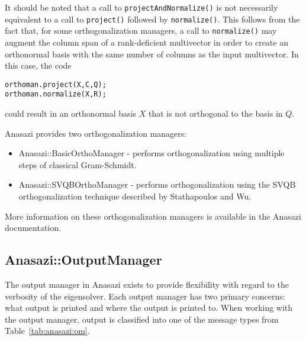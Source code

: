 It should be noted that a call to \verb!projectAndNormalize()! is not necessarily
equivalent to a call to \verb!project()! followed by \verb!normalize()!. This follows from
the fact that, for some orthogonalization managers, a call to \verb!normalize()! may
augment the column span of a rank-deficient multivector in order to create an orthonormal
basis with the same number of columns as the input multivector. In this case, the code
\begin{verbatim}
orthoman.project(X,C,Q);
orthoman.normalize(X,R);
\end{verbatim}
\noindent could result in an orthonormal basis $X$ that is not orthogonal to the basis in $Q$.

Anasazi provides two orthogonalization managers:
\begin{itemize}
  \item Anasazi::BasicOrthoManager - performs orthogonalization using multiple steps of
    classical Gram-Schmidt.
  \item Anasazi::SVQBOrthoManager - performs orthogonalization using the SVQB
    orthogonalization technique described by Stathapoulos and Wu.
\end{itemize}

More information on these orthogonalization managers is available in the Anasazi
documentation.

\subsection{Anasazi::OutputManager}
\label{sec:anasazi:printer}

The output manager in Anasazi exists to provide
flexibility with regard to the verbosity of the eigensolver. Each output manager has
two primary concerns: what output is printed and where the output is printed to.
When working with the output manager, output is classified into one of the 
message types from Table~\ref{tab:anasazi:om}.

